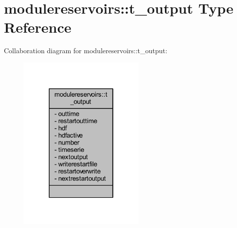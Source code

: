 \hypertarget{structmodulereservoirs_1_1t__output}{}\section{modulereservoirs\+:\+:t\+\_\+output Type Reference}
\label{structmodulereservoirs_1_1t__output}


Collaboration diagram for modulereservoirs\+:\+:t\+\_\+output\+:\nopagebreak
\begin{figure}[H]
\begin{center}
\leavevmode
\includegraphics[width=178pt]{structmodulereservoirs_1_1t__output__coll__graph}
\end{center}
\end{figure}
